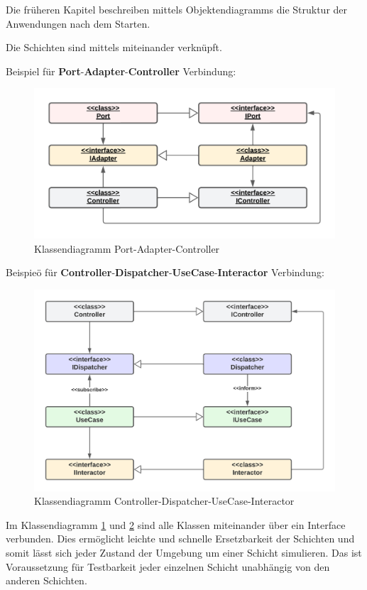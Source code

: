 Die früheren Kapitel beschreiben mittels Objektendiagramms die Struktur der Anwendungen nach dem Starten.

Die Schichten sind mittels \textbf{} miteinander verknüpft.

Beispiel für \textbf{Port}-\textbf{Adapter}-\textbf{Controller} Verbindung:

\begin{figure}[H]
    \centering
    \includegraphics[width=12cm]{./images/Klassendiagramm Port-Adapter.png}
    \caption[Klassendiagramm Port-Adapter-Controller]{Klassendiagramm Port-Adapter-Controller}
    \label{fig:FullCDPAC}
\end{figure}

Beispieö für \textbf{Controller}-\textbf{Dispatcher}-\textbf{UseCase}-\textbf{Interactor} Verbindung:
\begin{figure}[H]
    \centering
    \includegraphics[width=12cm]{./images/CDUI-Klassendiagramm.png}
    \caption[Klassendiagramm Controller-Dispatcher-UseCase-Interactor]{Klassendiagramm Controller-Dispatcher-UseCase-Interactor}
    \label{fig:FullCDCDUI}
\end{figure}

Im Klassendiagramm \ref{fig:FullCDPAC} und \ref{fig:FullCDCDUI} sind alle Klassen miteinander über ein Interface verbunden.
Dies ermöglicht leichte und schnelle Ersetzbarkeit der Schichten und 
somit lässt sich jeder Zustand der Umgebung um einer Schicht simulieren. 
Das ist Voraussetzung für Testbarkeit jeder einzelnen Schicht unabhängig von den anderen Schichten.